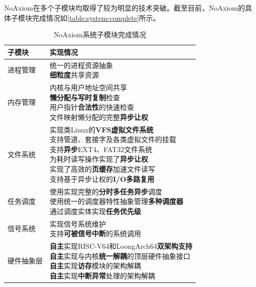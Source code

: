 \documentclass{article}
\begin{document}
NoAxiom在多个子模块均取得了较为明显的技术突破。截至目前，NoAxiom的具体子模块完成情况如\autoref{table:system-complete}所示。

\begin{table}[H]
\centering
\caption{NoAxiom系统子模块完成情况}
\label{table:system-complete}
\begin{tabular}{p{3cm} p{9cm}}\toprule
    \textbf{子模块}& \textbf{实现情况}\\\toprule
    进程管理&\parbox{9cm}{
        统一的进程资源抽象\newline
        \textbf{细粒度}共享资源}
    \\\midrule
    
    内存管理&\parbox{9cm}{
        内核与用户地址空间共享\newline
        \textbf{懒分配与写时复制}检查\newline
        用户指针\textbf{合法性}的快速检查\newline
        文件映射懒分配的完整\textbf{异步让权}
    }\\\midrule
    
    文件系统&\parbox{9cm}{
        实现类Linux的\textbf{VFS虚拟文件系统}\newline
        支持管道、套接字及各类虚拟文件的挂载\newline
        支持\textbf{异步}EXT4、FAT32文件系统\newline
        为耗时读写操作实现了\textbf{异步让权}\newline
        实现了高效的\textbf{页缓存}加速文件读写\newline
        支持基于异步让权的\textbf{I/O多路复用}
    }\\\midrule
    
    任务调度&\parbox{9cm}{
        使用实现完整的\textbf{分时多任务异步}调度\newline
        使用统一的调度器特性抽象管理\textbf{多种调度器}\newline
        通过调度实体实现\textbf{任务优先级}
    }\\\midrule
    
    信号系统&\parbox{9cm}{
        实现信号系统维护\newline
        支持\textbf{可被信号中断}的系统调用
    }\\\midrule
    
    硬件抽象层&\parbox{9cm}{
        \textbf{自主}实现RISC-V64和LoongArch64\textbf{双架构支持}\newline
        \textbf{自主}实现与内核\textbf{统一解耦}的顶层硬件抽象接口\newline
        \textbf{自主}实现\textbf{访存}模块的架构解耦\newline
        \textbf{自主}实现\textbf{中断异常}处理的架构解耦
    }\\\midrule


\end{tabular}
\end{table}
\end{document}
